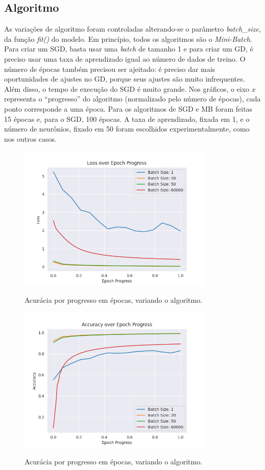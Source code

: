 \documentclass[a4paper]{article}
\begin{document}
\subsection{Algoritmo}%
\label{sub:Algoritmo}

As variações de algoritmo foram controladas alterando-se o parâmetro \textit{batch\_size}, da função \textit{fit()} do modelo. Em princípio, todos os algoritmos são o \textit{Mini-Batch}. Para criar um SGD, basta usar uma \textit{batch} de tamanho 1 e para criar um GD, é preciso usar uma taxa de aprendizado igual ao número de dados de treino. O número de épocas também precisou ser ajeitado: é preciso dar mais oportunidades de ajustes no GD, porque seus ajustes são muito infrequentes. Além disso, o tempo de execução do SGD é muito grande. Nos gráficos, o eixo $x$ representa o “progresso” do algoritmo (normalizado pelo número de épocas), cada ponto corresponde a uma época. Para os algoritmos de SGD e MB foram feitas 15 épocas e, para o SGD, 100 épocas. A taxa de aprendizado, fixada em 1, e o número de neurônios, fixado em 50 foram escolhidos experimentalmente, como nos outros casos.

\begin{figure}[H]
  \begin{center}
  {\includegraphics[height=7cm]{./images/Loss_over_Epoch_var_Alg.png}}
  \end{center}
  \caption{Acurácia por progresso em épocas, variando o algoritmo. \label{fig:lep}}
\end{figure}

\begin{figure}[H]
  \begin{center}
  {\includegraphics[height=7cm]{./images/Accuracy_over_Epoch_var_Alg.png}}
  \end{center}
  \caption{Acurácia por progresso em épocas, variando o algoritmo.\label{fig:aep}}
\end{figure}
\end{document}
